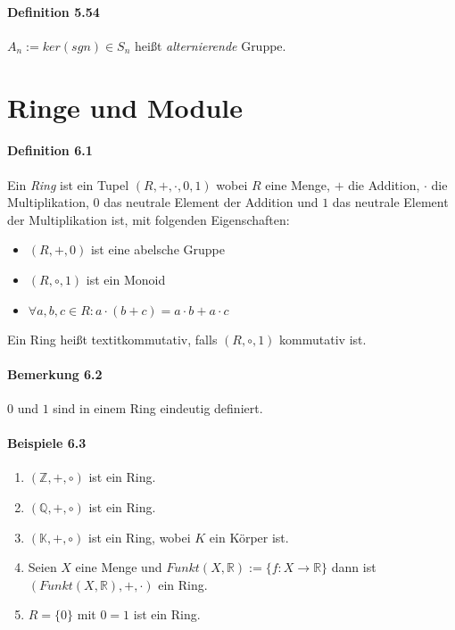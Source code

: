 \documentclass{scrartcl}
\begin{document}
\paragraph{Definition 5.54}
$A_n := ker(sgn) \in S_n$ heißt \textit{alternierende} Gruppe.

\section{Ringe und Module}
\label{sec:ringeundmodule}

\paragraph{Definition 6.1} 
Ein \textit{Ring} ist ein Tupel $(R, +, \cdot, 0, 1)$ wobei $R$ eine Menge, $+$
die Addition, $\cdot$ die Multiplikation, $0$ das neutrale Element der Addition
und $1$ das neutrale Element der Multiplikation ist, mit folgenden Eigenschaften:
\begin{itemize}
\item $(R, +, 0)$ ist eine abelsche Gruppe
\item $(R, \circ, 1)$ ist ein Monoid
\item $\forall a,b,c \in R: a \cdot (b + c) = a \cdot b + a \cdot c$
\end{itemize}
Ein Ring heißt textit{kommutativ}, falls $(R, \circ, 1)$ kommutativ ist.

\paragraph{Bemerkung 6.2}
$0$ und $1$ sind in einem Ring eindeutig definiert.

\paragraph{Beispiele 6.3}
\begin{enumerate}
\item $(\mathbb{Z}, +, \circ)$ ist ein Ring.
\item $(\mathbb{Q}, +, \circ)$ ist ein Ring.
\item $(\mathbb{K}, +, \circ)$ ist ein Ring, wobei $K$ ein Körper ist.
\item Seien $X$ eine Menge und $Funkt(X, \mathbb{R}) := \{f: X \to \mathbb{R}\}$
  dann ist $(Funkt(X, \mathbb{R}), +, \cdot)$ ein Ring.
\item $R = \{0\}$ mit  $0 = 1$ ist ein Ring.
\end{enumerate}
\end{document}
